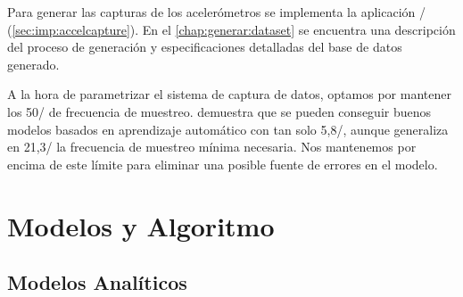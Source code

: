 Para generar las capturas de los acelerómetros se implementa la aplicación \accelcapture/ (\autoref{sec:imp:accelcapture}). En el  \autoref{chap:generar:dataset} se encuentra una descripción del proceso de generación y especificaciones detalladas del base de datos generado.
\iffalse
\todo{no ponerlo como apéndice, es parte importante, ponerlo aquí (referenciar ciertas cosas al apéndice que sean de menor interés)}
\fi
A la hora de parametrizar el sistema de captura de datos, optamos por mantener los 50\hz/ de frecuencia de muestreo. \cite{Liu2018} demuestra que se pueden conseguir buenos modelos basados en aprendizaje automático con tan solo 5,8\hz/, aunque generaliza en 21,3\hz/ la frecuencia de muestreo mínima necesaria. Nos mantenemos por encima de este límite para eliminar una posible fuente de errores en el modelo.





\section{Modelos y Algoritmo}\label{sec:req:modelos}
\iffalse
\todo{nada de vaguedades, qué modelos, cuales voy a usar, qué valores he calculado yo y cuales vienen de fuera}
Estudios similares han mostrado la mayor capacidad de los sistemas basados en aprendizaje automático. Sin embargo estos algoritmos no han conseguido desplazar en los sistemas comerciales a los métodos analíticos por la gran capacidad de cálculo que requieren. Algunos trabajos han demostrado la eficacia de hibridar los modelos usando un modelo computacionalmente simple para realizar una tarea de detección de candidatos a caídas de fondo y un modelo complejo que actúe únicamente sobre este subconjunto de episodios. Este es el acercamiento que toma este trabajo.
\fi
\subsection{Modelos Analíticos}

